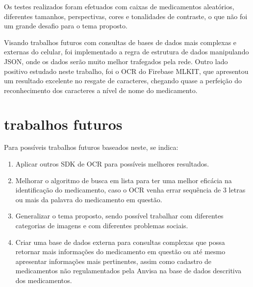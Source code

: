 Os testes realizados foram efetuados com caixas de medicamentos aleatórios, diferentes tamanhos, perspectivas, cores e tonalidades de contraste, o que não foi um grande desafio para o tema proposto.

Visando trabalhos futuros com consultas de bases de dados mais complexas e externas do celular, foi implementado a regra de estrutura de dados manipulando JSON, onde os dados serão muito melhor trafegados pela rede. Outro lado positivo estudado neste trabalho, foi o OCR do Firebase MLKIT, que apresentou um resultado excelente no resgate de caracteres, chegando quase a perfeição do reconhecimento dos caracteres a nível de nome do medicamento.

\section{trabalhos futuros}


Para possíveis trabalhos futuros baseados neste, se indica:

\begin{enumerate}
  \item Aplicar outros SDK de OCR para possíveis melhores resultados.
  \item Melhorar o algoritmo de busca em lista para ter uma melhor eficácia na identificação do medicamento, caso o OCR venha errar sequência de 3 letras ou mais da palavra do medicamento em questão.
  \item Generalizar o tema proposto, sendo possível trabalhar com diferentes categorias de imagens e com diferentes problemas sociais.
  \item Criar uma base de dados externa para consultas complexas que possa retornar mais informações do medicamento em questão ou até mesmo apresentar informações mais pertinentes, assim como cadastro de medicamentos não regulamentados pela Anvisa na base de dados descritiva dos medicamentos.
\end{enumerate}


